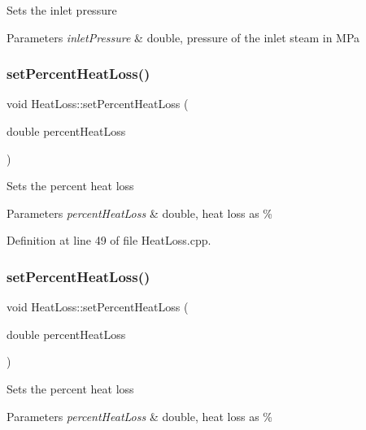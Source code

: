 Sets the inlet pressure 
\begin{DoxyParams}{Parameters}
{\em inlet\+Pressure} & double, pressure of the inlet steam in M\+Pa \\
\hline
\end{DoxyParams}
\mbox{\label{class_heat_loss_a2a4a80b16c1f975e194ae466b20d46bd}} 
\subsubsection{\texorpdfstring{set\+Percent\+Heat\+Loss()}{setPercentHeatLoss()}\hspace{0.1cm}{\footnotesize\ttfamily [1/3]}}
{\footnotesize\ttfamily void Heat\+Loss\+::set\+Percent\+Heat\+Loss (\begin{DoxyParamCaption}\item[{double}]{percent\+Heat\+Loss }\end{DoxyParamCaption})}

Sets the percent heat loss 
\begin{DoxyParams}{Parameters}
{\em percent\+Heat\+Loss} & double, heat loss as \% \\
\hline
\end{DoxyParams}


Definition at line 49 of file Heat\+Loss.\+cpp.

\mbox{\label{class_heat_loss_a2a4a80b16c1f975e194ae466b20d46bd}} 
\subsubsection{\texorpdfstring{set\+Percent\+Heat\+Loss()}{setPercentHeatLoss()}\hspace{0.1cm}{\footnotesize\ttfamily [2/3]}}
{\footnotesize\ttfamily void Heat\+Loss\+::set\+Percent\+Heat\+Loss (\begin{DoxyParamCaption}\item[{double}]{percent\+Heat\+Loss }\end{DoxyParamCaption})}

Sets the percent heat loss 
\begin{DoxyParams}{Parameters}
{\em percent\+Heat\+Loss} & double, heat loss as \% \\
\hline
\end{DoxyParams}
\mbox{\label{class_heat_loss_a2a4a80b16c1f975e194ae466b20d46bd}} 
